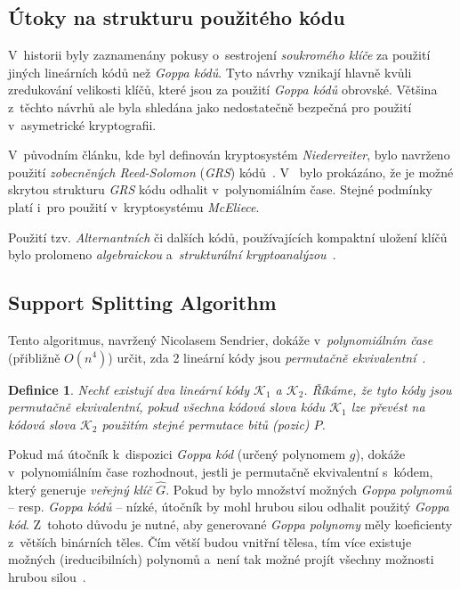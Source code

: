 \documentclass[thesis=M,czech,hidelinks]{FITthesis}[2012/06/26]
\newcommand{\0}{{\textcolor[gray]{0.75}{0}}}
\newtheorem{definice}{Definice}
\begin{document}
\subsection{Útoky na strukturu použitého kódu}\label{kap_utoky_na_strukturu_kodu}

V~historii byly zaznamenány pokusy o~sestrojení \emph{soukromého klíče} za
použití jiných lineárních kódů než \emph{Goppa kódů}. Tyto návrhy vznikají
hlavně kvůli zredukování velikosti klíčů, které jsou za použití \emph{Goppa
kódů} obrovské. Většina z~těchto návrhů ale byla shledána jako nedostatečně
bezpečná pro použití v~asymetrické kryptografii.

V~původním článku, kde byl definován kryptosystém \emph{Niederreiter}, bylo
navrženo použití \emph{zobecněných Reed-Solomon} (\emph{GRS})
kódů~\cite{Niederreiter}. V~\cite{Sidelnikov} bylo prokázáno, že je možné
skrytou strukturu \emph{GRS} kódu odhalit v~polynomiálním čase. Stejné podmínky
platí i~pro použití v~kryptosystému \emph{McEliece}.

Použití tzv. \emph{Alternantních} či dalších kódů, používajících kompaktní
uložení klíčů bylo prolomeno \emph{algebraickou} a~\emph{strukturální
kryptoanalýzou}~\cite{Faugere1,Faugere2,Umana}.


\subsection{Support Splitting Algorithm}

Tento algoritmus, navržený Nicolasem Sendrier, dokáže v~\emph{polynomiálním
čase} (přibližně $O(n^4)$) určit, zda 2 lineární kódy jsou \emph{permutačně
ekvivalentní}~\cite{Sendrier}.

\begin{definice}
    Nechť existují dva lineární kódy $\mathcal{K}_1$ a $\mathcal{K}_2$. Říkáme,
    že tyto kódy jsou \emph{permutačně ekvivalentní}, pokud všechna kódová slova
    kódu $\mathcal{K}_1$ lze převést na kódová slova $\mathcal{K}_2$ použitím
    stejné permutace bitů (pozic) $P$.
\end{definice}

Pokud má útočník k~dispozici \emph{Goppa kód} (určený polynomem $g$), dokáže
v~polynomiálním čase rozhodnout, jestli je permutačně ekvivalentní s~kódem,
který generuje \emph{veřejný klíč} $\hat{G}$. Pokud by bylo množství možných
\emph{Goppa polynomů} -- resp. \emph{Goppa kódů} -- nízké, útočník by mohl
hrubou silou odhalit použitý \emph{Goppa kód}. Z~tohoto důvodu je nutné, aby
generované \emph{Goppa polynomy} měly koeficienty z~větších binárních těles. Čím
větší budou vnitřní tělesa, tím více existuje možných (ireducibilních) polynomů
a~není tak možné projít všechny možnosti hrubou silou~\cite{Repka}.
\end{document}
